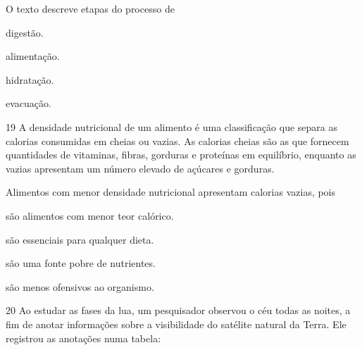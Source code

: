 O texto descreve etapas do processo de

\begin{minipage}{.5\textwidth}
\begin{escolha}
\item digestão.

\item alimentação.

\item hidratação.

\item evacuação.
\end{escolha}
\end{minipage}


\num{19} A densidade nutricional de um alimento é uma classificação
que separa as calorias consumidas em cheias ou vazias. As calorias
cheias são as que fornecem quantidades de vitaminas, fibras, gorduras e
proteínas em equilíbrio, enquanto as vazias apresentam um número elevado
de açúcares e gorduras.

Alimentos com menor densidade nutricional apresentam calorias vazias,
pois

\begin{minipage}{.5\textwidth}
\begin{escolha}
\item são alimentos com menor teor calórico.

\item são essenciais para qualquer dieta.

\item são uma fonte pobre de nutrientes.

\item são menos ofensivos ao organismo.
\end{escolha}
\end{minipage}

\pagebreak
\num{20} Ao estudar as fases da lua, um pesquisador observou o céu
todas as noites, a fim de anotar informações sobre a visibilidade do
satélite natural da Terra. Ele registrou as anotações numa tabela:

